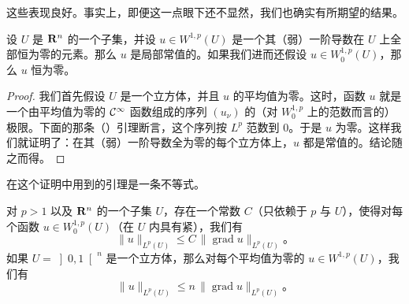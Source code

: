 这些\trWeakDerivative{}表现良好。事实上，即便这一点眼下还不显然，我们也确实有所期望的结果。

\begin{proposition}\label{thm:locally-constant-weak-derivatives}
设 $U$ 是 $\mathbf{R}^{n}$ 的一个\trBounded{}\trOpen{}子集，并设 $u\in W^{1,p}(U)$ 是一个其（弱）一阶导数在 $U$ 上全部恒为零的元素。那么 $u$ 是局部常值的。如果我们进而还假设 $u\in W^{1,p}_{0}(U)$，那么 $u$ 恒为零。
\end{proposition}

\begin{proof}
我们首先假设 $U$ 是一个立方体，并且 $u$ 的平均值为零。这时，函数 $u$ 就是一个由平均值为零的 $\mathcal{C}^{\infty}$ 函数组成的序列 $(u_{\nu})$ 的（对 $W^{1,p}_{0}$ 上的范数而言的）极限。下面的那条（\trPoincare）引理断言，这个序列按 $L^{p}$ 范数\trConvergence{}到 $0$。于是 $u$ 为零。这样我们就证明了：在其（弱）一阶导数全为零的每个立方体上，$u$ 都是常值的。结论随之而得。
\end{proof}

在这个证明中用到的\trPoincare{}引理是一条不等式。

\begin{lemma}\label{thm:poincare-inequality}
对 $p>1$ 以及 $\mathbf{R}^{n}$ 的一个\trBounded{}\trOpen{}子集 $U$，存在一个常数 $C$（只依赖于 $p$ 与 $U$），使得对每个函数 $u\in W^{1,p}_{0}(U)$（在 $U$ 内具有紧\trSupport{}），我们有
\[
\|u\|_{L^{p}(U)}\le C\,\|\operatorname{grad}u\|_{L^{p}(U)}\text{。}
\]
如果 $U=\left]0,1\right[^{n}$ 是一个立方体，那么对每个平均值为零的 $u\in W^{1,p}(U)$，我们有
\[
\|u\|_{L^{p}(U)}\le n\,\|\operatorname{grad}u\|_{L^{p}(U)}\text{。}
\]
\end{lemma}

